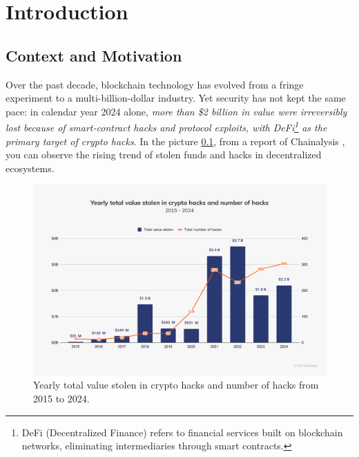 \cleardoublepage
{}
{}
\chapter*{Introduction}
\setlength{\headheight}{14pt}

\begingroup
\setcounter{section}{0} 
\renewcommand{\thesection}{\arabic{section}.} 

\section{Context and Motivation} \label{contextMotivation}
Over the past decade, blockchain technology has evolved from a fringe experiment to a multi-billion-dollar industry.  
Yet security has not kept the same pace: in calendar year 2024 alone, \textit{more than \$2 billion in value were irreversibly lost because of smart‑contract hacks and protocol exploits, with DeFi\footnote{DeFi (Decentralized Finance) refers to financial services built on blockchain networks, eliminating intermediaries through smart contracts.} as the primary target of crypto hacks}. In the picture \ref{fig:stolen-funds}, from a report of Chainalysis \cite{chainalysisblog}, you can observe the rising trend of stolen funds and hacks in decentralized ecosystems.

\begin{figure}[h]
    \centering
    \includegraphics[width=1.0\linewidth]{Images/Introduction/stolen-funds-chainanalysis.png}
    \caption{Yearly total value stolen in crypto hacks and number of hacks from 2015 to 2024.}
    \label{fig:stolen-funds}
\end{figure}

